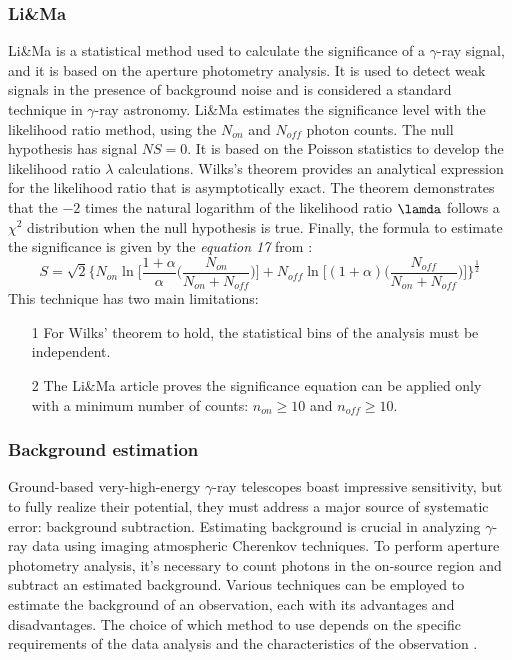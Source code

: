 \subsubsection{Li\&Ma}
\label{ss:li-ma}
Li\&Ma is a statistical method used to calculate the significance of a $\gamma$-ray signal, and it is based on the aperture photometry analysis. It is used to detect weak signals in the presence of background noise and is considered a standard technique in $\gamma$-ray astronomy. Li\&Ma estimates the significance level with the likelihood ratio method, using the $N_{on}$ and $N_{off}$ photon counts. The null hypothesis has signal $NS = 0$. It is based on the Poisson statistics to develop the likelihood ratio $\lambda$ calculations. Wilks's theorem \cite{wilks_1938} provides an analytical expression for the likelihood ratio that is asymptotically exact. The theorem demonstrates that the $-2$ times the natural logarithm of the likelihood ratio $\lamda$ follows a $\chi^2$ distribution when the null hypothesis is true. Finally, the formula to estimate the significance is given by the \textit{equation 17} from \cite{Lima_1983}: 
\begin{equation}
    S = \sqrt{2}\biggl\{N_{on}\ln\biggr[ \frac{1+\alpha}{\alpha} \biggl( \frac{N_{on}}{N_{on}+N_{off}}\biggl) \biggr] + N_{off}\ln\biggr[(1+\alpha)\biggl(\frac{N_{off}}{N_{on}+N_{off}}\biggl) \biggr] \biggl\}^\frac{1}{2}
\end{equation}
This technique has two main limitations:
\begin{enumerate}
    \item[1] For Wilks' theorem to hold, the statistical bins of the analysis must be independent.
    \item[2] The Li\&Ma article \cite{Lima_1983} proves the significance equation can be applied only with a minimum number of counts: $n_{on} \geq 10$ and $ n_{off} \geq 10$. 
\end{enumerate}


\subsubsection{Background estimation}
\label{sss:background-estimation}
Ground-based very-high-energy $\gamma$-ray telescopes boast impressive sensitivity, but to fully realize their potential, they must address a major source of systematic error: background subtraction. Estimating background is crucial in analyzing $\gamma$-ray data using imaging atmospheric Cherenkov techniques. To perform aperture photometry analysis, it's necessary to count photons in the on-source region and subtract an estimated background. Various techniques can be employed to estimate the background of an observation, each with its advantages and disadvantages. The choice of which method to use depends on the specific requirements of the data analysis and the characteristics of the observation \cite{Berge_2007}. 

